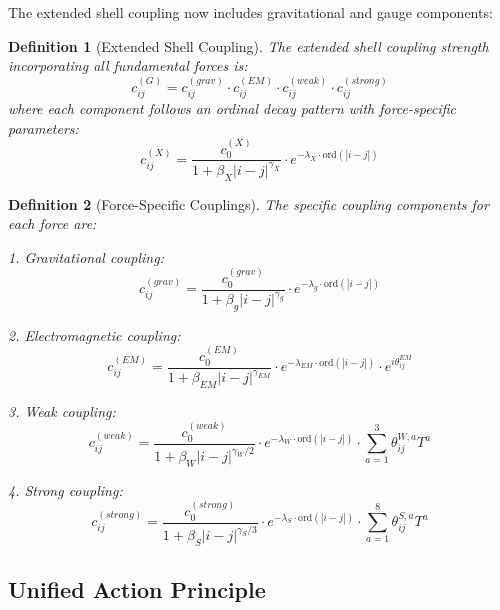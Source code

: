\documentclass[12pt,a4paper]{article}
\newtheorem{definition}{Definition}[section]
\newcommand{\ord}{\text{ord}}
\begin{document}
The extended shell coupling now includes gravitational and gauge components:

\begin{definition}[Extended Shell Coupling]
\label{def:extended-coupling}
The extended shell coupling strength incorporating all fundamental forces is:
\begin{equation}
c_{ij}^{(G)} = c_{ij}^{(grav)} \cdot c_{ij}^{(EM)} \cdot c_{ij}^{(weak)} \cdot c_{ij}^{(strong)}
\end{equation}
where each component follows an ordinal decay pattern with force-specific parameters:
\begin{equation}
c_{ij}^{(X)} = \frac{c_0^{(X)}}{1 + \beta_X |i-j|^{\gamma_X}} \cdot e^{-\lambda_X \cdot \ord(|i-j|)}
\end{equation}
\end{definition}

\begin{definition}[Force-Specific Couplings]
\label{def:force-couplings}
The specific coupling components for each force are:

1. Gravitational coupling:
\begin{equation}
c_{ij}^{(grav)} = \frac{c_0^{(grav)}}{1 + \beta_g |i-j|^{\gamma_g}} \cdot e^{-\lambda_g \cdot \ord(|i-j|)}
\end{equation}

2. Electromagnetic coupling:
\begin{equation}
c_{ij}^{(EM)} = \frac{c_0^{(EM)}}{1 + \beta_{EM} |i-j|^{\gamma_{EM}}} \cdot e^{-\lambda_{EM} \cdot \ord(|i-j|)} \cdot e^{i\theta_{ij}^{EM}}
\end{equation}

3. Weak coupling:
\begin{equation}
c_{ij}^{(weak)} = \frac{c_0^{(weak)}}{1 + \beta_W |i-j|^{\gamma_W/2}} \cdot e^{-\lambda_W \cdot \ord(|i-j|)} \cdot \sum_{a=1}^3 \theta_{ij}^{W,a} T^a
\end{equation}

4. Strong coupling:
\begin{equation}
c_{ij}^{(strong)} = \frac{c_0^{(strong)}}{1 + \beta_S |i-j|^{\gamma_S/3}} \cdot e^{-\lambda_S \cdot \ord(|i-j|)} \cdot \sum_{a=1}^8 \theta_{ij}^{S,a} T^a
\end{equation}
\end{definition}

\subsection{Unified Action Principle}
\label{subsec:unified-action}
\end{document}
